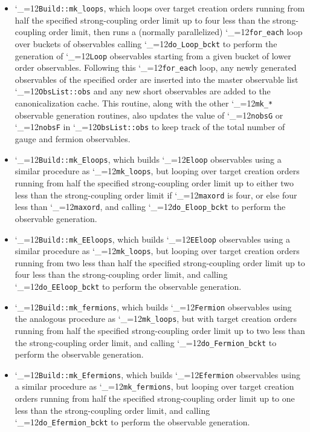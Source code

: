 \documentclass [12pt]{article}
\makeatletter
\renewcommand{\tt}{\begingroup\catcode`_=12\def\_{\string_}\tt@}
\newcommand{\tt@}[1]{\texttt{#1}\endgroup}
\makeatother
\begin{document}
\begin{itemize}
\item
    \tt{Build::mk_loops}, which loops over target creation orders
    running from half the specified strong-coupling order limit
    up to four less than the strong-coupling order limit,
    then runs a (normally parallelized) \tt{for_each} loop over
    buckets of observables calling \tt{do_Loop_bckt} to perform the
    generation of \tt{Loop} observables starting from
    a given bucket of lower order observables.
    Following this \tt{for_each} loop,
    any newly generated observables of the specified order
    are inserted into the master observable list
    \tt{ObsList::obs} and any new short observables
    are added to the canonicalization cache.
    This routine, along with the other \tt{mk_*} observable generation
    routines, also updates the value of \tt{nobsG} or \tt{nobsF}
    in \tt{ObsList::obs} to keep track of the total number
    of gauge and fermion observables.

\item
    \tt{Build::mk_Eloops}, which builds \tt{Eloop}
    observables using a similar procedure 
    as \tt{mk_loops}, but looping over target creation orders
    running from half the specified strong-coupling order limit
    up to either two less than the strong-coupling order limit if
    \tt{maxord} is four, or else four less than \tt{maxord},
    and calling \tt{do_Eloop_bckt} to perform the observable generation.

\item
    \tt{Build::mk_EEloops}, which builds \tt{EEloop}
    observables using a similar procedure 
    as \tt{mk_loops}, but looping over target creation orders
    running from two less than half the specified strong-coupling order limit
    up to four less than the strong-coupling order limit,
    and calling \tt{do_EEloop_bckt} to perform the observable generation.

\item
    \tt{Build::mk_fermions}, which builds \tt{Fermion}
    observables using the analogous procedure
    as \tt{mk_loops}, but with
    target creation orders
    running from half the specified strong-coupling order limit
    up to two less than the strong-coupling order limit,
    and calling \tt{do_Fermion_bckt} to perform the
    observable generation.

\item
    \tt{Build::mk_Efermions}, which builds \tt{Efermion}
    observables using a similar procedure 
    as \tt{mk_fermions}, but looping over target creation orders
    running from half the specified strong-coupling order limit
    up to one less than the strong-coupling order limit,
    and calling \tt{do_Efermion_bckt} to perform the observable generation.


\end{itemize}
\end{document}

